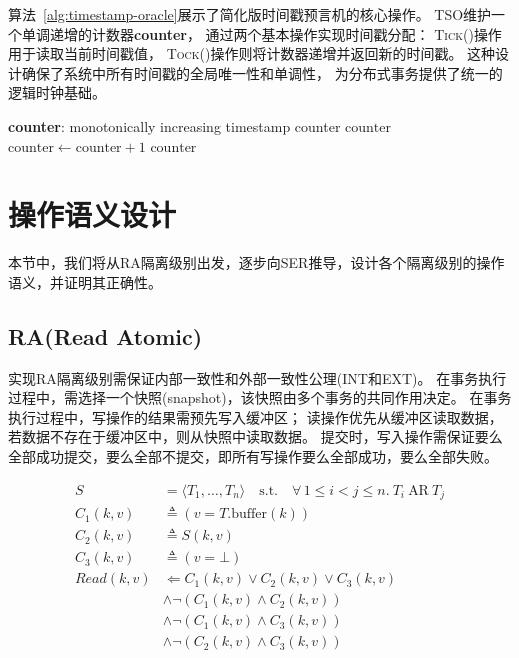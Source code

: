 算法~\ref{alg:timestamp-oracle}展示了简化版时间戳预言机的核心操作。
TSO维护一个单调递增的计数器\textbf{counter}，
通过两个基本操作实现时间戳分配：
\textsc{Tick()}操作用于读取当前时间戳值，
\textsc{Tock()}操作则将计数器递增并返回新的时间戳。
这种设计确保了系统中所有时间戳的全局唯一性和单调性，
为分布式事务提供了统一的逻辑时钟基础。


\begin{algorithm}[H]
\caption{Timestamp Oracle}
\label{alg:timestamp-oracle}
\begin{algorithmic}[1]
\State \textbf{counter}: monotonically increasing timestamp counter
    \State \Return $\text{counter}$ 
\EndProcedure
{}
    \State $\text{counter} \gets \text{counter} + 1$
    \State \Return $\text{counter}$ 
\EndProcedure
\end{algorithmic}
\end{algorithm}

\section{操作语义设计}

本节中，我们将从RA隔离级别出发，逐步向SER推导，设计各个隔离级别的操作语义，并证明其正确性。

\subsection{RA(Read Atomic)}

实现RA隔离级别需保证内部一致性和外部一致性公理(INT和EXT)。
在事务执行过程中，需选择一个快照(snapshot)，该快照由多个事务的共同作用决定。
在事务执行过程中，写操作的结果需预先写入缓冲区；
读操作优先从缓冲区读取数据，若数据不存在于缓冲区中，则从快照中读取数据。
提交时，写入操作需保证要么全部成功提交，要么全部不提交，即所有写操作要么全部成功，要么全部失败。

\begin{equation}
\begin{aligned}
S &= \langle T_1,\dots,T_n\rangle
\quad\text{s.t.}\quad
\forall\, 1 \le i < j \le n.\ T_i\  \text{AR} \  T_j \\
C_1(k,v) &\triangleq (v = T.\text{buffer}(k))\\
C_2(k,v) &\triangleq S(k,v)\\
C_3(k,v) &\triangleq (v = \bot)\\
Read(k,v) &\Longleftarrow C_1(k,v) \lor C_2(k,v) \lor C_3(k,v)\\
          &\land \neg(C_1(k,v) \land C_2(k,v))\\
          &\land \neg(C_1(k,v) \land C_3(k,v))\\
          &\land \neg(C_2(k,v) \land C_3(k,v))
\end{aligned}
\end{equation}


